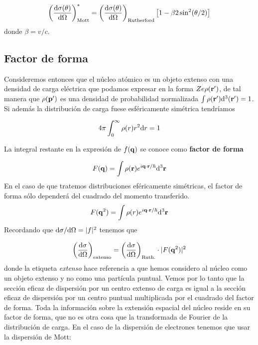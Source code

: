 \begin{eqnarray}
	\left( \frac{\mathrm{d} \sigma(\theta)}{\mathrm{d} \Omega} \right)_{\text{Mott}}^* = 
	\left( \frac{\mathrm{d} \sigma(\theta)}{\mathrm{d} \Omega} \right)_{\text{Rutherford}} \left[ 1-\beta2 \sin^2(\theta/2) \right] 
\end{eqnarray}
donde $\beta=v/c$.





\subsection{Factor de forma}

Consideremos entonces que el núcleo atómico es un objeto extenso con una densidad de carga eléctrica que podamos expresar en la forma $Ze\rho (\mathbf{r}')$, de tal manera que $\rho(\mathbf{p}')$ es una densidad de probabilidad normalizada $\int \rho (\mathbf{r}') \mathrm{d}^3 (\mathbf{r}')=1$. Si además la distribución de carga fuese esféricamente simétrica tendríamos

\begin{equation}
	4 \pi \int_0^\infty \rho (r) r^2 \mathrm{d} r = 1
\end{equation}


La integral restante en la expresión de $f(\mathbf{q})$ se conoce como \textbf{factor de forma}

\begin{equation}
    F(\mathbf{q}) = \int \rho (\mathbf{r}) e^{i \mathbf{q} \cdot \mathbf{r} / \hbar} \mathrm{d}^3 \mathbf{r}
\end{equation}
En el caso de que tratemos distribuciones eféricamente simétricas, el factor de forma sólo dependerá del cuadrado del momento transferido.
\begin{equation}
    F(\mathbf{q}^2) = \int \rho (r) e^{i \mathbf{q} \cdot \mathbf{r} / \hbar} \mathrm{d}^3 \mathbf{r}
\end{equation}
Recordando que $\mathrm{d} \sigma / \mathrm{d} \Omega = |f|^2$ tenemos que

\begin{equation}
    \left( \frac{\mathrm{d} \sigma}{\mathrm{d} \Omega} \right)_{\text{extenso}} = \left( \frac{\mathrm{d} \sigma}{\mathrm{d} \Omega} \right)_{\text{Ruth.}} \cdot |F(\mathbf{q}^2)|^2
\end{equation} 
donde la etiqueta \textit{extenso} hace referencia a que hemos considero al núcleo como un objeto extenso y no como una partícula puntual. Vemos por lo tanto que la sección eficaz de dispersión por un centro extenso de carga es igual a la sección eficaz de dispersión por un centro puntual multiplicada por el cuadrado del factor de forma. Toda la información sobre la extensión espacial del núcleo reside en su factor de forma, que no es otra cosa que la transformada de Fourier de la distribución de carga. En el caso de la dispersión de electrones tenemos que usar la dispersión de Mott:

